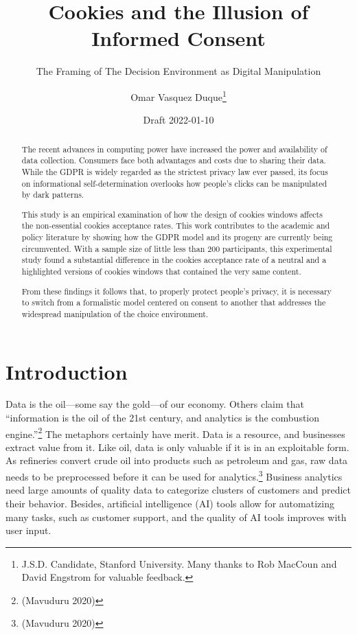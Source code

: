 \documentclass[
  11pt,
  letterpaper,
]{article}
\title{Cookies and the Illusion of Informed Consent}
\subtitle{The Framing of The Decision Environment as Digital Manipulation}
\author{Omar Vasquez Duque\footnote{J.S.D. Candidate, Stanford University. Many thanks to Rob MacCoun and David Engstrom for valuable feedback.}}
\date{Draft 2022-01-10}
\begin{document}
\maketitle
\begin{abstract}
The recent advances in computing power have increased the power and availability of data collection. Consumers face both advantages and costs due to sharing their data. While the GDPR is widely regarded as the strictest privacy law ever passed, its focus on informational self-determination overlooks how people's clicks can be manipulated by dark patterns.

This study is an empirical examination of how the design of cookies windows affects the non-essential cookies acceptance rates. This work contributes to the academic and policy literature by showing how the GDPR model and its progeny are currently being circumvented. With a sample size of little less than 200 participants, this experimental study found a substantial difference in the cookies acceptance rate of a neutral and a highlighted versions of cookies windows that contained the very same content.

From these findings it follows that, to properly protect people's privacy, it is necessary to switch from a formalistic model centered on consent to another that addresses the widespread manipulation of the choice environment.
\end{abstract}

\hypertarget{introduction}{%
\section{Introduction}\label{introduction}}

Data is the oil---some say the gold---of our economy. Others claim that ``information is the oil of the 21st century, and analytics is the combustion engine.''\footnote{(Mavuduru 2020)} The metaphors certainly have merit. Data is a resource, and businesses extract value from it. Like oil, data is only valuable if it is in an exploitable form. As refineries convert crude oil into products such as petroleum and gas, raw data needs to be preprocessed before it can be used for analytics.\footnote{(Mavuduru 2020)} Business analytics need large amounts of quality data to categorize clusters of customers and predict their behavior. Besides, artificial intelligence (AI) tools allow for automatizing many tasks, such as customer support, and the quality of AI tools improves with user input.
\end{document}

